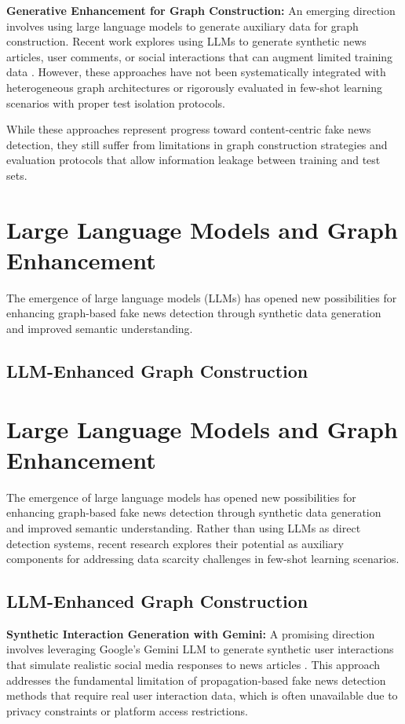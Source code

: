 \textbf{Generative Enhancement for Graph Construction:} An emerging direction involves using large language models to generate auxiliary data for graph construction. Recent work explores using LLMs to generate synthetic news articles, user comments, or social interactions that can augment limited training data \cite{yang2023let, zhang2023enhancing}. However, these approaches have not been systematically integrated with heterogeneous graph architectures or rigorously evaluated in few-shot learning scenarios with proper test isolation protocols.

While these approaches represent progress toward content-centric fake news detection, they still suffer from limitations in graph construction strategies and evaluation protocols that allow information leakage between training and test sets.

\section{Large Language Models and Graph Enhancement}

The emergence of large language models (LLMs) has opened new possibilities for enhancing graph-based fake news detection through synthetic data generation and improved semantic understanding.

\subsection{LLM-Enhanced Graph Construction}

\section{Large Language Models and Graph Enhancement}

The emergence of large language models has opened new possibilities for enhancing graph-based fake news detection through synthetic data generation and improved semantic understanding. Rather than using LLMs as direct detection systems, recent research explores their potential as auxiliary components for addressing data scarcity challenges in few-shot learning scenarios.

\subsection{LLM-Enhanced Graph Construction}

\textbf{Synthetic Interaction Generation with Gemini:} A promising direction involves leveraging Google's Gemini LLM to generate synthetic user interactions that simulate realistic social media responses to news articles \cite{yang2023let, zhang2023on}. This approach addresses the fundamental limitation of propagation-based fake news detection methods that require real user interaction data, which is often unavailable due to privacy constraints or platform access restrictions.

